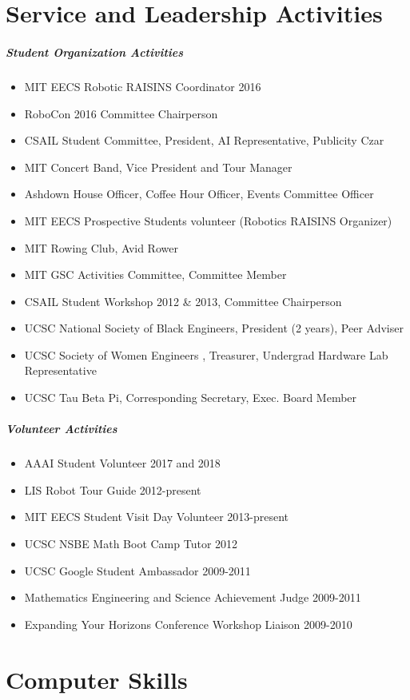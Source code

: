 \documentclass[10pt,letterpaper]{article}
\begin{document}
\section*{Service and Leadership Activities}
\subparagraph{Student Organization Activities}
\begin{itemize}
    \item MIT EECS Robotic RAISINS Coordinator 2016
	\item RoboCon 2016 Committee Chairperson 
	\item CSAIL Student Committee, President, AI Representative, Publicity Czar  
	\item MIT Concert Band,  Vice President and Tour Manager 
	\item Ashdown House Officer,  Coffee Hour Officer, Events Committee Officer 
	\item MIT EECS Prospective Students volunteer (Robotics RAISINS Organizer)
	\item MIT Rowing Club,  Avid Rower 
	\item MIT GSC Activities Committee, Committee Member 
	\item CSAIL Student Workshop 2012 \& 2013, Committee Chairperson  
	\item UCSC National Society of Black Engineers,   President (2 years), Peer Adviser 
	\item UCSC Society of Women Engineers , Treasurer, Undergrad Hardware Lab Representative 
	\item UCSC Tau Beta Pi,  Corresponding Secretary, Exec. Board Member  
\end{itemize}
\subparagraph{Volunteer Activities}
\begin{itemize}    
    \item AAAI Student Volunteer 2017 and 2018
    \item LIS Robot Tour Guide 2012-present
    \item MIT EECS Student Visit Day Volunteer 2013-present
	\item UCSC NSBE Math Boot Camp Tutor  2012     
	\item UCSC Google Student Ambassador  2009-2011  
	\item Mathematics Engineering and Science Achievement Judge   2009-2011  
	\item Expanding Your Horizons Conference Workshop Liaison  2009-2010
\end{itemize}


\section*{Computer Skills}
\end{document}
